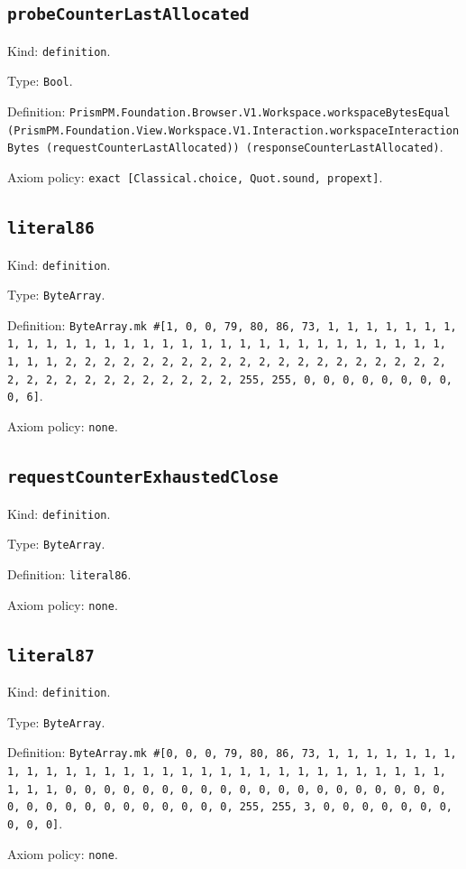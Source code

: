 \documentclass[11pt]{article}
\begin{document}
\subsection*{\texttt{probeCounterLastAllocated}}
\noindent Kind: \texttt{definition}.\par
\noindent Type: \texttt{Bool}.\par
\noindent Definition: \texttt{PrismPM.Foundation.Browser.V1.Workspace.workspaceBytesEqual (PrismPM.Foundation.View.Workspace.V1.Interaction.workspaceInteractionBytes (requestCounterLastAllocated)) (responseCounterLastAllocated)}.\par
\noindent Axiom policy: \texttt{exact [Classical.choice, Quot.sound, propext]}.\par
\subsection*{\texttt{literal86}}
\noindent Kind: \texttt{definition}.\par
\noindent Type: \texttt{ByteArray}.\par
\noindent Definition: \texttt{ByteArray.mk \#[1, 0, 0, 79, 80, 86, 73, 1, 1, 1, 1, 1, 1, 1, 1, 1, 1, 1, 1, 1, 1, 1, 1, 1, 1, 1, 1, 1, 1, 1, 1, 1, 1, 1, 1, 1, 1, 1, 1, 1, 2, 2, 2, 2, 2, 2, 2, 2, 2, 2, 2, 2, 2, 2, 2, 2, 2, 2, 2, 2, 2, 2, 2, 2, 2, 2, 2, 2, 2, 2, 2, 2, 255, 255, 0, 0, 0, 0, 0, 0, 0, 0, 0, 6]}.\par
\noindent Axiom policy: \texttt{none}.\par
\subsection*{\texttt{requestCounterExhaustedClose}}
\noindent Kind: \texttt{definition}.\par
\noindent Type: \texttt{ByteArray}.\par
\noindent Definition: \texttt{literal86}.\par
\noindent Axiom policy: \texttt{none}.\par
\subsection*{\texttt{literal87}}
\noindent Kind: \texttt{definition}.\par
\noindent Type: \texttt{ByteArray}.\par
\noindent Definition: \texttt{ByteArray.mk \#[0, 0, 0, 79, 80, 86, 73, 1, 1, 1, 1, 1, 1, 1, 1, 1, 1, 1, 1, 1, 1, 1, 1, 1, 1, 1, 1, 1, 1, 1, 1, 1, 1, 1, 1, 1, 1, 1, 1, 1, 0, 0, 0, 0, 0, 0, 0, 0, 0, 0, 0, 0, 0, 0, 0, 0, 0, 0, 0, 0, 0, 0, 0, 0, 0, 0, 0, 0, 0, 0, 0, 0, 255, 255, 3, 0, 0, 0, 0, 0, 0, 0, 0, 0, 0]}.\par
\noindent Axiom policy: \texttt{none}.\par
\end{document}
